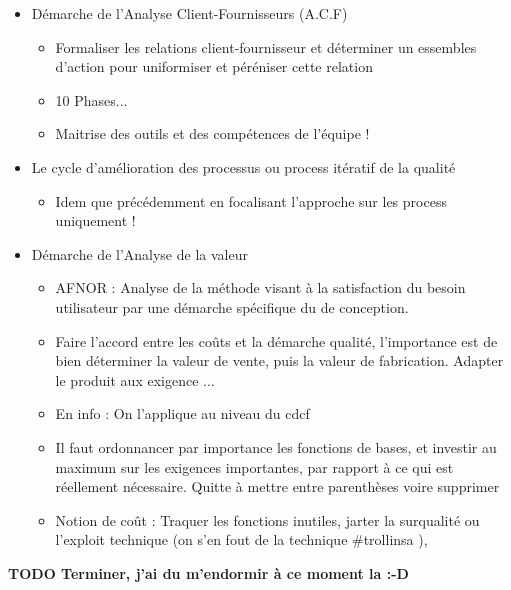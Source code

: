 \begin{itemize}
	\item Démarche de l’Analyse Client-Fournisseurs (A.C.F)
	\begin{itemize}
		\item Formaliser les relations client-fournisseur et déterminer un essembles d’action pour uniformiser et péréniser cette relation
		\item 10 Phases...
		\item  Maitrise des outils et des compétences de l’équipe !
	\end{itemize}


	\item Le cycle d’amélioration des processus ou process itératif de la qualité
	\begin{itemize}
		\item Idem que précédemment en focalisant l’approche sur les process uniquement !
	\end{itemize}


	\item Démarche de l’Analyse de la valeur
	\begin{itemize}
		\item AFNOR : Analyse de la méthode visant à la satisfaction du besoin utilisateur par une démarche spécifique du de conception.
		\item Faire l’accord entre les coûts et la démarche qualité, l’importance est de bien déterminer la valeur de vente, puis la valeur de fabrication. Adapter le produit aux exigence ...
		\item En info : On l’applique au niveau du cdcf
		\item Il faut ordonnancer par importance les fonctions de bases, et investir au maximum sur les exigences importantes, par rapport à ce qui est réellement nécessaire. Quitte à mettre entre parenthèses voire supprimer
		\item Notion de coût : Traquer les fonctions inutiles, jarter la surqualité ou l’exploit technique (on s’en fout de la technique \#trollinsa ),
	\end{itemize}

\end{itemize}

   
\textbf{TODO Terminer, j’ai du m’endormir à ce moment la :-D}
